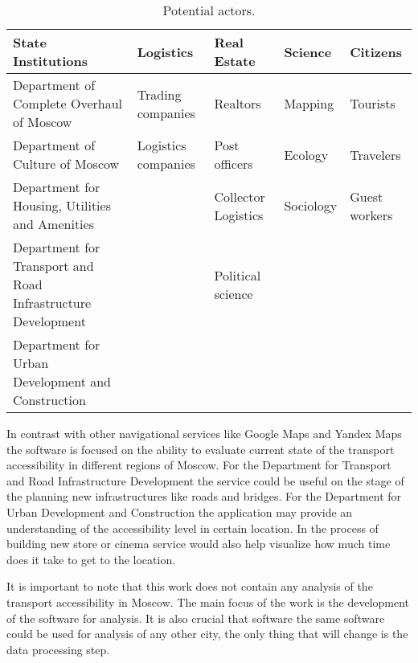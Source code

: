 \begin{table}[ht]
  \renewcommand{\arraystretch}{1.5}
  \centering
  \footnotesize
  \begin{tabular}{p{4cm} p{2.5cm} p{2.5cm} p{1.5cm} p{2.2cm}}
    \hline
    \textbf{State Institutions} & \textbf{Logistics} &\textbf{Real Estate}
    & \textbf{Science} & \textbf{Citizens} \\
    \hline

    Department of Complete Overhaul of Moscow &
    Trading companies &
    Realtors &
    Mapping &
    Tourists \\


    Department of Culture of Moscow &
    Logistics companies &
    Post officers &
    Ecology &
    Travelers  \\


    Department for Housing, Utilities and Amenities &
    &
    Collector Logistics &
    Sociology &
    Guest workers \\


    Department for Transport and Road Infrastructure Development
    &
    &
    Political science &
    \\


    Department for Urban Development and Construction &
    &
    &
    &
    \\

    \hline
  \end{tabular}

  \caption{Potential actors.}
  \label{tab:actors}
\end{table}

In contrast with other navigational services like Google Maps and Yandex Maps the software is
focused on the ability to evaluate current state of the transport accessibility in different regions
of Moscow. For the Department for Transport and Road Infrastructure Development the service could be
useful on the stage of the planning new infrastructures like roads and bridges. For the Department for
Urban Development and Construction the application may provide an understanding of the
accessibility level in certain location. In the process of building new store or cinema service
would also help visualize how much time does it take to get to the location.

It is important to note that this work does not contain any analysis of the transport accessibility
in Moscow. The main focus of the work is the development of the software for analysis. It is also
crucial that software the same software could be used for analysis of any other city, the only
thing that will change is the data processing step.


